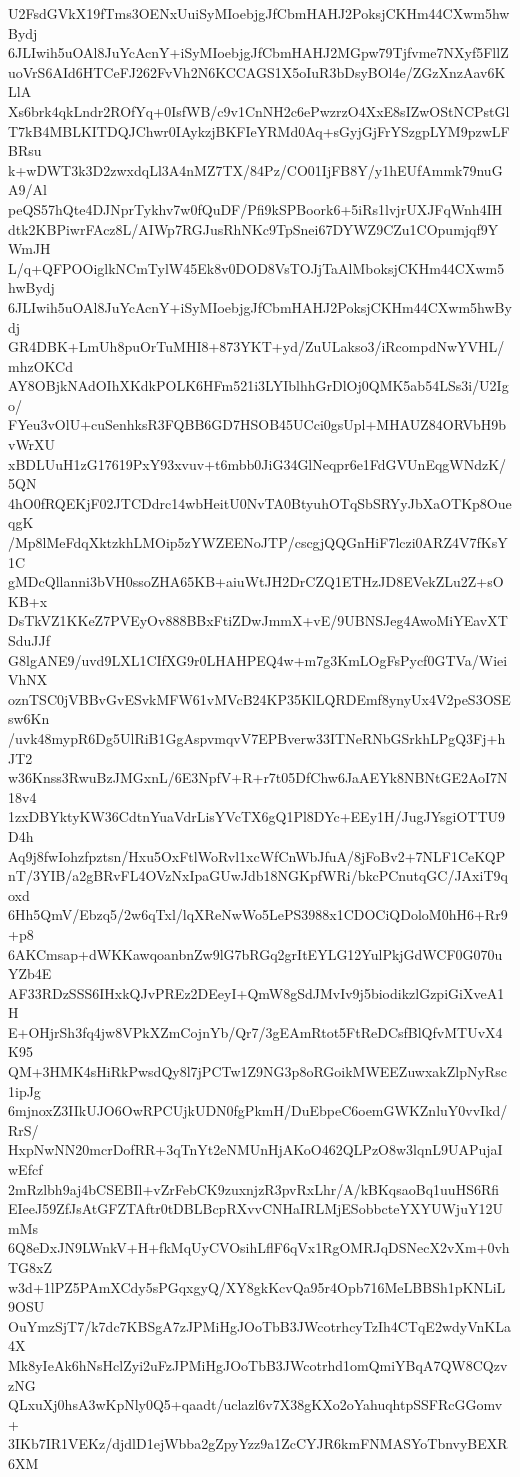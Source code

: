 U2FsdGVkX19fTms3OENxUuiSyMIoebjgJfCbmHAHJ2PoksjCKHm44CXwm5hwBydj
6JLIwih5uOAl8JuYcAcnY+iSyMIoebjgJfCbmHAHJ2MGpw79Tjfvme7NXyf5FllZ
uoVrS6AId6HTCeFJ262FvVh2N6KCCAGS1X5oIuR3bDsyBOl4e/ZGzXnzAav6KLlA
Xs6brk4qkLndr2ROfYq+0IsfWB/c9v1CnNH2c6ePwzrzO4XxE8sIZwOStNCPstGl
T7kB4MBLKITDQJChwr0IAykzjBKFIeYRMd0Aq+sGyjGjFrYSzgpLYM9pzwLFBRsu
k+wDWT3k3D2zwxdqLl3A4nMZ7TX/84Pz/CO01IjFB8Y/y1hEUfAmmk79nuGA9/Al
peQS57hQte4DJNprTykhv7w0fQuDF/Pfi9kSPBoork6+5iRs1lvjrUXJFqWnh4IH
dtk2KBPiwrFAcz8L/AIWp7RGJusRhNKc9TpSnei67DYWZ9CZu1COpumjqf9YWmJH
L/q+QFPOOiglkNCmTylW45Ek8v0DOD8VsTOJjTaAlMboksjCKHm44CXwm5hwBydj
6JLIwih5uOAl8JuYcAcnY+iSyMIoebjgJfCbmHAHJ2PoksjCKHm44CXwm5hwBydj
GR4DBK+LmUh8puOrTuMHI8+873YKT+yd/ZuULakso3/iRcompdNwYVHL/mhzOKCd
AY8OBjkNAdOIhXKdkPOLK6HFm521i3LYIblhhGrDlOj0QMK5ab54LSs3i/U2Igo/
FYeu3vOlU+cuSenhksR3FQBB6GD7HSOB45UCci0gsUpl+MHAUZ84ORVbH9bvWrXU
xBDLUuH1zG17619PxY93xvuv+t6mbb0JiG34GlNeqpr6e1FdGVUnEqgWNdzK/5QN
4hO0fRQEKjF02JTCDdrc14wbHeitU0NvTA0BtyuhOTqSbSRYyJbXaOTKp8OueqgK
/Mp8lMeFdqXktzkhLMOip5zYWZEENoJTP/cscgjQQGnHiF7lczi0ARZ4V7fKsY1C
gMDcQllanni3bVH0ssoZHA65KB+aiuWtJH2DrCZQ1ETHzJD8EVekZLu2Z+sOKB+x
DsTkVZ1KKeZ7PVEyOv888BBxFtiZDwJmmX+vE/9UBNSJeg4AwoMiYEavXTSduJJf
G8lgANE9/uvd9LXL1CIfXG9r0LHAHPEQ4w+m7g3KmLOgFsPycf0GTVa/WieiVhNX
oznTSC0jVBBvGvESvkMFW61vMVcB24KP35KlLQRDEmf8ynyUx4V2peS3OSEsw6Kn
/uvk48mypR6Dg5UlRiB1GgAspvmqvV7EPBverw33ITNeRNbGSrkhLPgQ3Fj+hJT2
w36Knss3RwuBzJMGxnL/6E3NpfV+R+r7t05DfChw6JaAEYk8NBNtGE2AoI7N18v4
1zxDBYktyKW36CdtnYuaVdrLisYVcTX6gQ1Pl8DYc+EEy1H/JugJYsgiOTTU9D4h
Aq9j8fwIohzfpztsn/Hxu5OxFtlWoRvl1xcWfCnWbJfuA/8jFoBv2+7NLF1CeKQP
nT/3YIB/a2gBRvFL4OVzNxIpaGUwJdb18NGKpfWRi/bkcPCnutqGC/JAxiT9qoxd
6Hh5QmV/Ebzq5/2w6qTxl/lqXReNwWo5LePS3988x1CDOCiQDoloM0hH6+Rr9+p8
6AKCmsap+dWKKawqoanbnZw9lG7bRGq2grItEYLG12YulPkjGdWCF0G070uYZb4E
AF33RDzSSS6IHxkQJvPREz2DEeyI+QmW8gSdJMvIv9j5biodikzlGzpiGiXveA1H
E+OHjrSh3fq4jw8VPkXZmCojnYb/Qr7/3gEAmRtot5FtReDCsfBlQfvMTUvX4K95
QM+3HMK4sHiRkPwsdQy8l7jPCTw1Z9NG3p8oRGoikMWEEZuwxakZlpNyRsc1ipJg
6mjnoxZ3IIkUJO6OwRPCUjkUDN0fgPkmH/DuEbpeC6oemGWKZnluY0vvIkd/RrS/
HxpNwNN20mcrDofRR+3qTnYt2eNMUnHjAKoO462QLPzO8w3lqnL9UAPujaIwEfcf
2mRzlbh9aj4bCSEBIl+vZrFebCK9zuxnjzR3pvRxLhr/A/kBKqsaoBq1uuHS6Rfi
EIeeJ59ZfJsAtGFZTAftr0tDBLBcpRXvvCNHaIRLMjESobbcteYXYUWjuY12UmMs
6Q8eDxJN9LWnkV+H+fkMqUyCVOsihLflF6qVx1RgOMRJqDSNecX2vXm+0vhTG8xZ
w3d+1lPZ5PAmXCdy5sPGqxgyQ/XY8gkKcvQa95r4Opb716MeLBBSh1pKNLiL9OSU
OuYmzSjT7/k7dc7KBSgA7zJPMiHgJOoTbB3JWcotrhcyTzIh4CTqE2wdyVnKLa4X
Mk8yIeAk6hNsHclZyi2uFzJPMiHgJOoTbB3JWcotrhd1omQmiYBqA7QW8CQzvzNG
QLxuXj0hsA3wKpNly0Q5+qaadt/uclazl6v7X38gKXo2oYahuqhtpSSFRcGGomv+
3IKb7IR1VEKz/djdlD1ejWbba2gZpyYzz9a1ZcCYJR6kmFNMASYoTbnvyBEXR6XM
